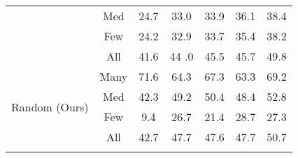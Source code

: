 \documentclass{article}
\newcommand{\thickhline}{\hlineB{4}}
\begin{document}
{\begin{table}[ht]
{{\begin{tabular}{l|c|ccccc}
                                        & Med                  & 24.7                   & 33.0                         & 33.9                         & 36.1                   & 38.4                     \\
                                        & Few                  & 24.2                   & 32.9                       & 33.7                         & 35.4                   & 38.2                     \\
                                        & All                  & 41.6                   & 44 .0                        & 45.5                         & 45.7                   & 49.8                     \\ \midrule
\multirow{4}{*}{Random (Ours)} & Many                 & 71.6                   & 64.3                       & 67.3                         & 63.3                   & 69.2                     \\
                                        & Med                  & 42.3                   & 49.2                       & 50.4                         & 48.4                   & 52.8                     \\
                                        & Few                  & 9.4                    & 26.7                       & 21.4                         & 28.7                   & 27.3                     \\
                                        & All                  & 42.7                   & 47.7                       & 47.6                         & 47.7                   & 50.7          \\
\thickhline
\end{tabular}}}
\end{table} }
\end{document}
